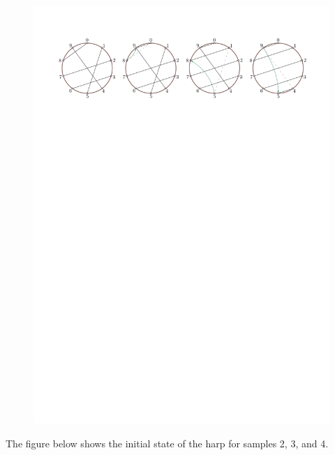 \begin{figure}
\centering
\includegraphics[width=\textwidth]{sample1}
\end{figure}

The figure below shows the initial state of the harp for samples 2, 3, and 4.

